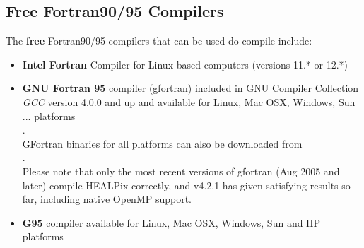 \documentclass[12pt,twoside]{article}
\begin{document}
\subsection{Free Fortran90/95 Compilers}
\label{sec:freef90compilers}
The {\bf free} Fortran90/95 compilers that can be used do compile \healpix include: 
    \begin{itemize}
      \item {\bf Intel Fortran} Compiler for Linux based computers (versions 11.*
or 12.*) \hfill \\
      \item {\bf GNU Fortran 95} compiler (gfortran) included in GNU Compiler Collection {\em GCC} version 4.0.0
         and up and available for Linux, Mac OSX, Windows, Sun ... platforms
         \hfill \\
          . \hfill \\
         GFortran binaries for all platforms can also be downloaded from  \hfill \\
          . \hfill \\
         Please note that only the most recent versions of gfortran (Aug 2005
         and later) compile HEALPix correctly, and v4.2.1 has given satisfying
         results so far, including native OpenMP support.
     \item {\bf G95} compiler available for Linux, Mac OSX, Windows, Sun and HP platforms
         \hfill \\ 
    \end{itemize}
\end{document}
